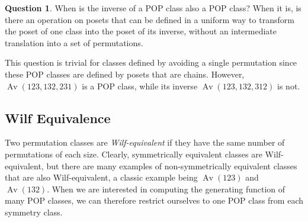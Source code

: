 \documentclass[11pt]{article}
\theoremstyle{definition}
\newtheorem{question}{Question}
\numberwithin{theorem}{section}
\numberwithin{question}{section}
\numberwithin{definition}{section}
\numberwithin{example}{section}
\numberwithin{remark}{section}
\newcommand{\Av}{\operatorname{Av}}
\begin{document}
\begin{question}
	When is the inverse of a POP class also a POP class? When it is, is there an operation on posets that can be defined in a uniform way to transform the poset of one class into the poset of its inverse, without an intermediate translation into a set of permutations.
\end{question}

This question is trivial for classes defined by avoiding a single permutation since these POP classes are defined by posets that are chains. However, $\Av(123, 132, 231)$ is a POP class, while its inverse $\Av(123, 132, 312)$ is not.

\subsection{Wilf Equivalence}

Two permutation classes are \emph{Wilf-equivalent} if they have the same number of permutations of each size. Clearly, symmetrically equivalent classes are Wilf-equivalent, but there are many examples of non-symmetrically equivalent classes that are also Wilf-equivalent, a classic example being $\Av(123)$ and $\Av(132)$. When we are interested in computing the generating function of many POP classes, we can therefore restrict ourselves to one POP class from each symmetry class.
\end{document}
